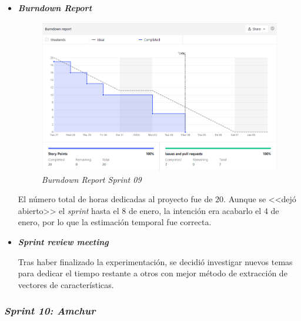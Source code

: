 \begin{itemize}
	\item \textbf{\textit{Burndown Report}}
	\begin{figure}[h]
		\caption{\textit{Burndown Report Sprint 09}}
		\centering
		\includegraphics[width=\textwidth]{../img/anexos/bdr/s09_bdr}
	\end{figure}
	
	El número total de horas dedicadas al proyecto fue de $20$. Aunque se <<dejó abierto>> el \textit{sprint} hasta el 8 de enero, la intención era acabarlo el 4 de enero, por lo que la estimación temporal fue correcta.
	
	\item \textbf{\textit{Sprint review meeting}}
	
	Tras haber finalizado la experimentación, se decidió investigar nuevos temas para dedicar el tiempo restante a otros con mejor método de extracción de vectores de características.
	
\end{itemize}

\subsubsection{\textit{Sprint 10: Amchur}}

